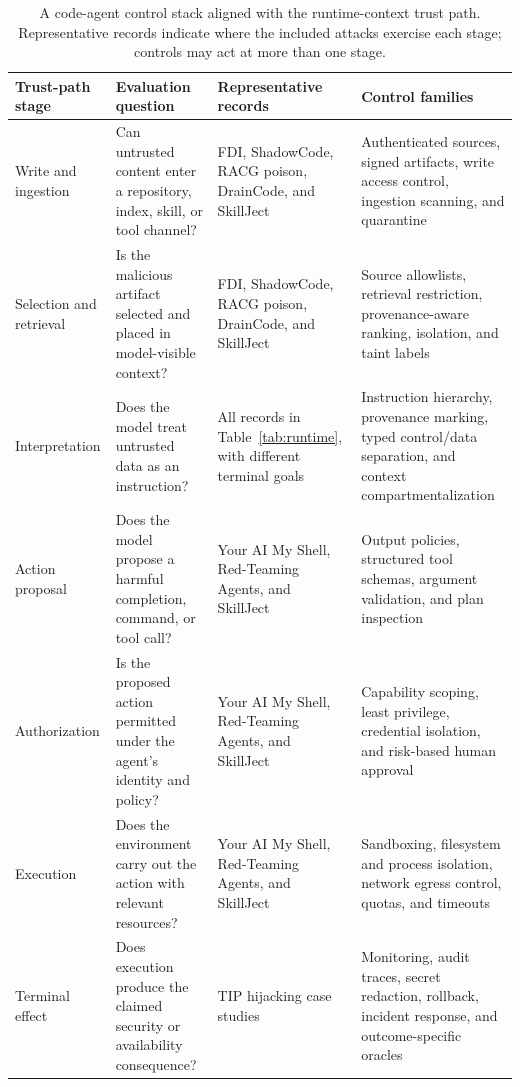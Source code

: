 \documentclass[acmsmall,screen,review,nonacm]{acmart}
\begin{document}
\begin{table}[t]
\centering
\small
\caption{A code-agent control stack aligned with the runtime-context trust path. Representative records indicate where the included attacks exercise each stage; controls may act at more than one stage.}
\label{tab:agent-control-stack}
\begin{tabularx}{\textwidth}{@{}L{2.15cm}L{3.10cm}L{4.00cm}Y@{}}
\toprule
\textbf{Trust-path stage} & \textbf{Evaluation question} & \textbf{Representative records} & \textbf{Control families} \\
\midrule
Write and ingestion & Can untrusted content enter a repository, index, skill, or tool channel? & FDI, ShadowCode, RACG poison, DrainCode, and SkillJect & Authenticated sources, signed artifacts, write access control, ingestion scanning, and quarantine \\
Selection and retrieval & Is the malicious artifact selected and placed in model-visible context? & FDI, ShadowCode, RACG poison, DrainCode, and SkillJect & Source allowlists, retrieval restriction, provenance-aware ranking, isolation, and taint labels \\
Interpretation & Does the model treat untrusted data as an instruction? & All records in Table~\ref{tab:runtime}, with different terminal goals & Instruction hierarchy, provenance marking, typed control/data separation, and context compartmentalization \\
Action proposal & Does the model propose a harmful completion, command, or tool call? & Your AI My Shell, Red-Teaming Agents, and SkillJect & Output policies, structured tool schemas, argument validation, and plan inspection \\
Authorization & Is the proposed action permitted under the agent's identity and policy? & Your AI My Shell, Red-Teaming Agents, and SkillJect & Capability scoping, least privilege, credential isolation, and risk-based human approval \\
Execution & Does the environment carry out the action with relevant resources? & Your AI My Shell, Red-Teaming Agents, and SkillJect & Sandboxing, filesystem and process isolation, network egress control, quotas, and timeouts \\
Terminal effect & Does execution produce the claimed security or availability consequence? & TIP hijacking case studies & Monitoring, audit traces, secret redaction, rollback, incident response, and outcome-specific oracles \\
\bottomrule
\end{tabularx}
\end{table}
\end{document}
